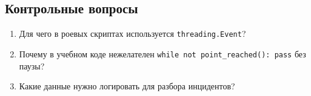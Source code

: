 \subsection{Контрольные вопросы}
\begin{enumerate}
\item Для чего в роевых скриптах используется \texttt{threading.Event}?
\item Почему в учебном коде нежелателен \texttt{while not point\_reached(): pass} без паузы?
\item Какие данные нужно логировать для разбора инцидентов?
\end{enumerate}
